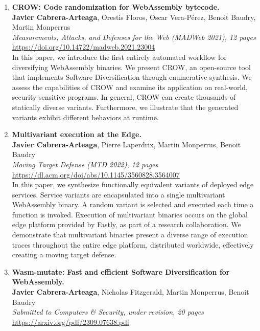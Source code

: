 \begin{enumerate}[label={\textbf{\Roman*}:}, ref={\Roman*}]
	\item \label{crowpaper} \textbf{CROW: Code randomization for WebAssembly bytecode.} \\ 
	\textbf{Javier Cabrera-Arteaga}, Orestis Floros, Oscar Vera-Pérez, Benoit Baudry, Martin Monperrus\\
	\textit{ Measurements, Attacks, and Defenses for the Web (MADWeb 2021), 12 pages} \\
	\url{https://doi.org/10.14722/madweb.2021.23004} \\
	
	 In this paper, we introduce the first entirely automated workflow for diversifying WebAssembly binaries. 
	We present CROW, an open-source tool that implements Software Diversification through enumerative synthesis. 
	We assess the capabilities of CROW and examine its application on real-world, security-sensitive programs.
	In general, CROW can create thousands of statically diverse variants. 
	Furthermore, we illustrate that the generated variants exhibit different behaviors at runtime.

	
	
	\item \label{mewepaper} \textbf{Multivariant execution at the Edge. } \\
	\textbf{Javier Cabrera-Arteaga}, Pierre Laperdrix, Martin Monperrus, Benoit Baudry\\
    \textit{Moving Target Defense (MTD 2022), 12 pages} \\
    \url{https://dl.acm.org/doi/abs/10.1145/3560828.3564007} \\

	In this paper, we synthesize functionally equivalent variants of deployed edge services. 
	Service variants are encapsulated into a single multivariant WebAssembly binary. 
	A random variant is selected and executed each time a function is invoked.
	Execution of multivariant binaries occurs on the global edge platform provided by Fastly, as part of a research collaboration. 
	We demonstrate that multivariant binaries present a diverse range of execution traces throughout the entire edge platform, distributed worldwide, effectively creating a moving target defense.

	
	\item \label{wasmmutatepaper}\textbf{Wasm-mutate: Fast and efficient Software Diversification for WebAssembly. }\\ 
	\textbf{Javier Cabrera-Arteaga}, Nicholas Fitzgerald, Martin Monperrus, Benoit Baudry\\
	\textit{Submitted to Computers \& Security, under revision, 20 pages} \\
	\url{https://arxiv.org/pdf/2309.07638.pdf}


\end{enumerate}

